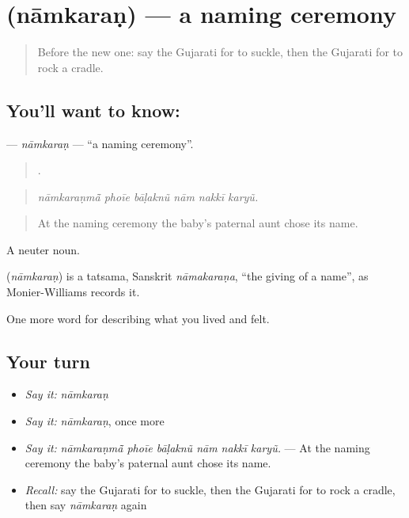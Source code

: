 \section[\texorpdfstring{\gu{નામકરણ} (nāmkaraṇ)}{નામકરણ (nāmkaraṇ)}]{ (nāmkaraṇ) — a naming ceremony}

\label{lesson:GU-C496-namkaran}



\begin{quote}
Before the new one: say the Gujarati for to suckle, then the Gujarati for to rock a cradle.
\end{quote}

\subsection*{You'll want to know: }
\textbf{} — \emph{nāmkaraṇ} — \textquotedblleft{}a naming ceremony\textquotedblright{}.

\begin{quote}
     .
\end{quote}

\begin{quote}
\emph{nāmkaraṇmā̃ phoīe bāḷaknũ nām nakkī karyũ.}
\end{quote}

\begin{quote}
At the naming ceremony the baby's paternal aunt chose its name.
\end{quote}

A neuter noun.

\begin{cousinweb}
\textbf{} (\emph{nāmkaraṇ}) is a tatsama, Sanskrit \emph{nāmakaraṇa}, \textquotedblleft{}the giving of a name\textquotedblright{}, as Monier-Williams records it.
\end{cousinweb}

\begin{grammarlens}[title={What you've built}]
One more word for describing what you lived and felt.
\end{grammarlens}

\subsection*{Your turn}
\begin{itemize}
\raggedright
  \item \emph{Say it:} \emph{nāmkaraṇ}
  \item \emph{Say it:} \emph{nāmkaraṇ}, once more
  \item \emph{Say it:} \emph{nāmkaraṇmā̃ phoīe bāḷaknũ nām nakkī karyũ.} — At the naming ceremony the baby's paternal aunt chose its name.
  \item \emph{Recall:} say the Gujarati for to suckle, then the Gujarati for to rock a cradle, then say \emph{nāmkaraṇ} again
\end{itemize}

